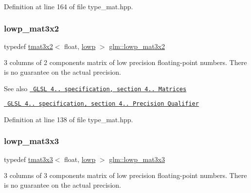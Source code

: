 Definition at line 164 of file type\+\_\+mat.\+hpp.

\mbox{\label{group__core__precision_ga8db0631a52908b3b4805b6abeda26176}} 
\subsubsection{\texorpdfstring{lowp\_mat3x2}{lowp\_mat3x2}}
{\footnotesize\ttfamily typedef \mbox{\hyperlink{structglm_1_1tmat3x2}{tmat3x2}}$<$ float, \mbox{\hyperlink{namespaceglm_a0f04f086094c747d227af4425893f545ae161af3fc695e696ce3bf69f7332bc2d}{lowp}} $>$ \mbox{\hyperlink{group__core__precision_ga8db0631a52908b3b4805b6abeda26176}{glm\+::lowp\+\_\+mat3x2}}}

3 columns of 2 components matrix of low precision floating-\/point numbers. There is no guarantee on the actual precision.

\begin{DoxySeeAlso}{See also}
\href{http://www.opengl.org/registry/doc/GLSLangSpec.4.20.8.pdf}{\texttt{ G\+L\+SL 4.. specification, section 4.. Matrices}} 

\href{http://www.opengl.org/registry/doc/GLSLangSpec.4.20.8.pdf}{\texttt{ G\+L\+SL 4.. specification, section 4.. Precision Qualifier}} 
\end{DoxySeeAlso}


Definition at line 138 of file type\+\_\+mat.\+hpp.

\mbox{\label{group__core__precision_ga8d591be4ef2bf3bbcd7473c3eadeaf55}} 
\subsubsection{\texorpdfstring{lowp\_mat3x3}{lowp\_mat3x3}}
{\footnotesize\ttfamily typedef \mbox{\hyperlink{structglm_1_1tmat3x3}{tmat3x3}}$<$ float, \mbox{\hyperlink{namespaceglm_a0f04f086094c747d227af4425893f545ae161af3fc695e696ce3bf69f7332bc2d}{lowp}} $>$ \mbox{\hyperlink{group__core__precision_ga8d591be4ef2bf3bbcd7473c3eadeaf55}{glm\+::lowp\+\_\+mat3x3}}}

3 columns of 3 components matrix of low precision floating-\/point numbers. There is no guarantee on the actual precision.

